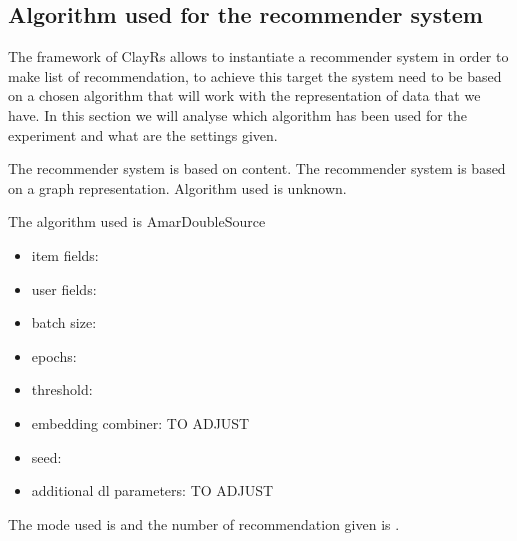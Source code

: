 \subsection{Algorithm used for the recommender system}\label{subsec:algo}
The framework of ClayRs allows to instantiate a recommender system in order to make list of recommendation, to achieve
this target the system need to be based on a chosen algorithm that will work with the representation of data that
we have.
In this section we will analyse which algorithm has been used for the experiment and what are the settings
given.
\hfill\break
\hfill\break

The recommender system is based on content.
\hfill\break
\hfill\break
{}
The recommender system is based on a graph representation.
\hfill\break
\hfill\break
{}
Algorithm used is unknown.
\hfill\break
\hfill\break
{}

The algorithm used is AmarDoubleSource
\begin{itemize}
    \item item fields:
    \item user fields:
    \item batch size: 
    \item epochs: 
    \item threshold: 
    \item embedding combiner: TO ADJUST
    \item seed: 
    \item additional dl parameters: TO ADJUST
\end{itemize}
\hfill\break
\hfill\break
The mode used is  and the number of recommendation given is
.
\hfill\break
\hfill\break



